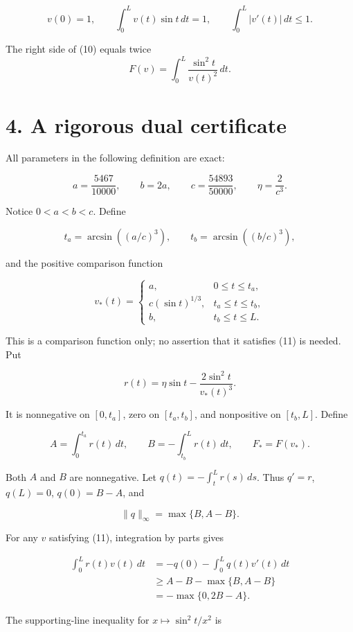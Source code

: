 \documentclass[11pt,a4paper]{article}
\begin{document}
\[
v(0)=1,\qquad
\int_0^L v(t)\sin t\,dt=1,\qquad
\int_0^L|v'(t)|\,dt\le1.
\tag{11}
\]

The right side of (10) equals twice \[
F(v)=\int_0^L\frac{\sin^2t}{v(t)^2}\,dt.
\tag{12}
\]

\hypertarget{1034-a-rigorous-dual-certificate}{%
\section{4. A rigorous dual
certificate}\label{1034-a-rigorous-dual-certificate}}

All parameters in the following definition are exact:

\[
a=\frac{5467}{10000},\qquad
b=2a,\qquad c=\frac{54893}{50000},\qquad
\eta=\frac2{c^3}.
\tag{13}
\]

Notice \(0<a<b<c\). Define

\[
t_a=\arcsin((a/c)^3),\qquad
t_b=\arcsin((b/c)^3),
\]

and the positive comparison function

\[
v_*(t)=
\begin{cases}
a,&0\le t\le t_a,\\
c(\sin t)^{1/3},&t_a\le t\le t_b,\\
b,&t_b\le t\le L.
\end{cases}
\tag{14}
\]

This is a comparison function only; no assertion that it satisfies (11)
is needed. Put

\[
r(t)=\eta\sin t-\frac{2\sin^2t}{v_*(t)^3}.
\]

It is nonnegative on \([0,t_a]\), zero on \([t_a,t_b]\), and nonpositive
on \([t_b,L]\). Define

\[
A=\int_0^{t_a}r(t)\,dt,\qquad
B=-\int_{t_b}^{L}r(t)\,dt,
\qquad F_* = F(v_*).
\tag{15}
\]

Both \(A\) and \(B\) are nonnegative. Let \(q(t)=-\int_t^L r(s)\,ds\).
Thus \(q'=r\), \(q(L)=0\), \(q(0)=B-A\), and

\[
\|q\|_\infty=\max\{B,A-B\}.
\tag{16}
\]

For any \(v\) satisfying (11), integration by parts gives

\[
\begin{aligned}
\int_0^L r(t)v(t)\,dt
&=-q(0)-\int_0^Lq(t)v'(t)\,dt\\
&\ge A-B-\max\{B,A-B\}\\
&=-\max\{0,2B-A\}.
\end{aligned}
\tag{17}
\]

The supporting-line inequality for \(x\mapsto\sin^2t/x^2\) is
\end{document}
